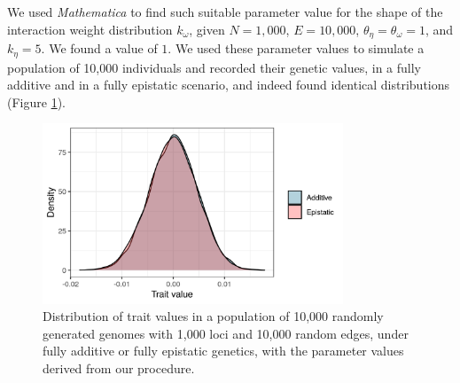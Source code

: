 \documentclass[]{article}
\begin{document}
We used \textit{Mathematica} to find such suitable parameter value for the shape of the interaction weight distribution $k_{\omega}$, given $N = 1,000$, $E = 10,000$, $\theta_{\eta} = \theta_{\omega} = 1$, and $k_{\eta} = 5$. We found a value of $1$. We used these parameter values to simulate a population of 10,000 individuals and recorded their genetic values, in a fully additive and in a fully epistatic scenario, and indeed found identical distributions (Figure \ref{fig:densities}).

\begin{figure}[H]
	\centering
	\includegraphics[width=0.8\textwidth]{gamma_param}
	\caption{Distribution of trait values in a population of 10,000 randomly generated genomes with 1,000 loci and 10,000 random edges, under fully additive or fully epistatic genetics, with the parameter values derived from our procedure.}
	\label{fig:densities}
\end{figure}
\end{document}
